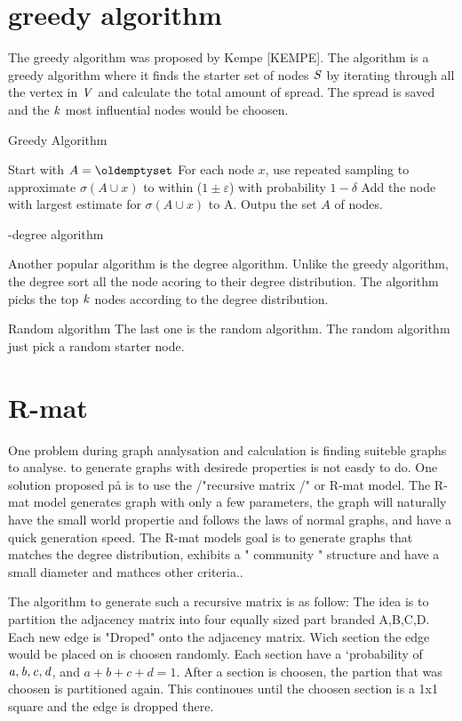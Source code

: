 \section{greedy algorithm}
The  greedy algorithm was proposed by Kempe [KEMPE]. The algorithm is a greedy algorithm where it finds the starter set of nodes $\it{S}$ by iterating through all the vertex in $\it{V}$ and calculate the total amount of spread. The spread is saved and the $\it{k}$ most influential nodes would be choosen.

 \begin{algorithm}
\caption{Greedy Algorithm}
\begin{algorithmic}[1]
\State Start with $A = \oldemptyset$
\State For each node $x$, use repeated sampling to approximate $\sigma(A \cup {x}) $ to within ($1 \pm \varepsilon$) with probability
$1 − \delta$
\State Add the node with largest estimate for $\sigma(A \cup {x})$ to A.
\EndWhile
\State Outpu the set $A$ of nodes.
\end{algorithmic}
\end{algorithm}

-degree algorithm

Another popular algorithm is the degree algorithm. Unlike the greedy algorithm, the degree sort all the node acoring to their degree distribution. The algorithm picks the top $\it{k}$ nodes according to the degree distribution. 

Random algorithm
The last one is the random algorithm. The random algorithm just pick a random starter node. 

\section{R-mat}
One problem during graph analysation and calculation is finding suiteble graphs to analyse. to generate graphs with desirede properties is not easdy to do. One solution proposed på \cite{RMat2004} is to use the /"recursive matrix /" or R-mat model. The R-mat model generates graph with only a few parameters, the graph will naturally have the small world propertie and follows the laws of normal graphs, and have a quick generation speed. The R-mat models goal is to generate graphs that matches the degree distribution, exhibits a " community " structure and have a small diameter and mathces other criteria.\cite{Rmat2004}.

The algorithm to generate such a recursive matrix is as follow: The idea is to partition the adjacency matrix into four equally sized part branded A,B,C,D. Each new edge is "Droped" onto the adjacency matrix. Wich section the edge would be placed on is choosen randomly. Each section have a `probability of $\it{a, b, c, d}$, and $a + b + c + d = 1$. After a section is choosen, the partion that was choosen is partitioned again. This continoues until the choosen section is a 1x1 square and the edge is dropped there. 

